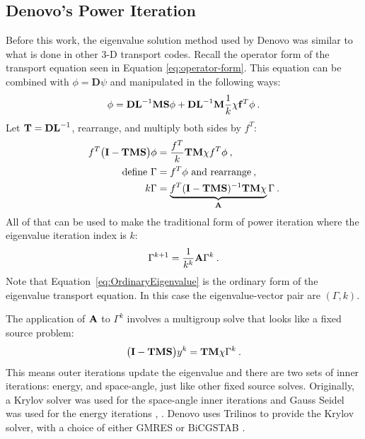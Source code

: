\subsection{Denovo's Power Iteration}
Before this work, the eigenvalue solution method used by Denovo was similar to what is done in other 3-D transport codes. Recall the operator form of the transport equation seen in Equation \eqref{eq:operator-form}. This equation can be combined with $\phi = \mathbf{D} \psi$ and manipulated in the following ways:
%
\begin{equation}
  \phi = \mathbf{DL}^{-1}\mathbf{MS}\phi + \mathbf{DL}^{-1}\mathbf{M}\frac{1}{k}\mathbf{\chi} \mathbf{f}^{T} \phi \:.
\end{equation}
%
Let $\mathbf{T} = \mathbf{DL}^{-1}$, rearrange, and multiply both sides by $f^{T}$:
\begin{align}
  f^{T}\bigl(\mathbf{I} - \mathbf{TMS}\bigr)\phi &= \frac{f^{T}}{k} \mathbf{TM}\chi f^{T} \phi \:, \label{eq:OperatorEvalForm} \\
  \text{define } \Gamma &= f^{T}\phi  \text{ and rearrange} \:, \nonumber \\
  k \Gamma &= \underbrace{f^{T}(\mathbf{I} - \mathbf{TMS})^{-1} \mathbf{TM} \chi}_{\mathbf{A}} \Gamma \:. \label{eq:OrdinaryEigenvalue}
\end{align}
%
All of that can be used to make the traditional form of power iteration where the eigenvalue iteration index is $k$:
%
\begin{equation}
  \Gamma^{k+1} =  \frac{1}{k^{k}}\mathbf{A} \Gamma^{k} \:.
\label{eq:PowerItForm} 
\end{equation}
Note that Equation~\eqref{eq:OrdinaryEigenvalue} is the ordinary form of the eigenvalue transport equation. In this case the eigenvalue-vector pair are $(\Gamma, k)$. 

The application of $\mathbf{A}$ to $\Gamma^{k}$ involves a multigroup solve that looks like a fixed source problem:
%
\begin{equation}
  \bigl(\mathbf{I} - \mathbf{TMS}\bigr)y^{k} = \mathbf{TM}\chi \Gamma^{k} \:.
\end{equation}
%
This means outer iterations update the eigenvalue and there are two sets of inner iterations: energy, and space-angle, just like other fixed source solves. Originally, a Krylov solver was used for the space-angle inner iterations and Gauss Seidel was used for the energy iterations \cite{Evans2009a}, \cite{Evans2011}. Denovo uses Trilinos \cite{Heroux2003} to provide the Krylov solver, with a choice of either GMRES or BiCGSTAB \cite{Evans2009}.

